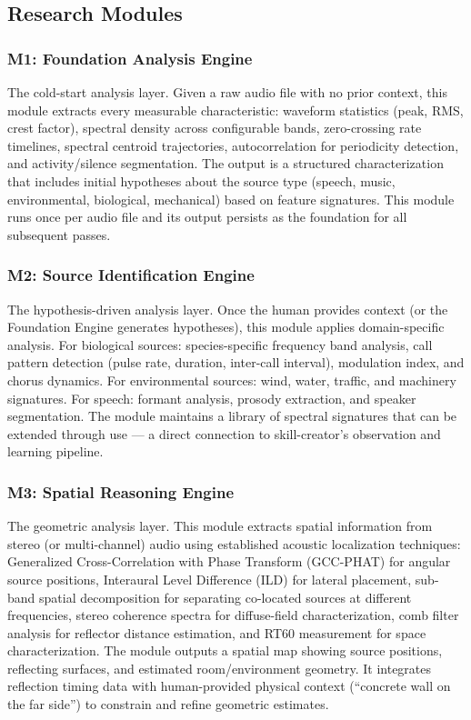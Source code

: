 \documentclass[11pt,letterpaper]{article}
\begin{document}
\subsection{Research Modules}

\subsubsection{M1: Foundation Analysis Engine}

The cold-start analysis layer. Given a raw audio file with no prior context, this module extracts every measurable characteristic: waveform statistics (peak, RMS, crest factor), spectral density across configurable bands, zero-crossing rate timelines, spectral centroid trajectories, autocorrelation for periodicity detection, and activity/silence segmentation. The output is a structured characterization that includes initial hypotheses about the source type (speech, music, environmental, biological, mechanical) based on feature signatures. This module runs once per audio file and its output persists as the foundation for all subsequent passes.

\subsubsection{M2: Source Identification Engine}

The hypothesis-driven analysis layer. Once the human provides context (or the Foundation Engine generates hypotheses), this module applies domain-specific analysis. For biological sources: species-specific frequency band analysis, call pattern detection (pulse rate, duration, inter-call interval), modulation index, and chorus dynamics. For environmental sources: wind, water, traffic, and machinery signatures. For speech: formant analysis, prosody extraction, and speaker segmentation. The module maintains a library of spectral signatures that can be extended through use --- a direct connection to skill-creator's observation and learning pipeline.

\subsubsection{M3: Spatial Reasoning Engine}

The geometric analysis layer. This module extracts spatial information from stereo (or multi-channel) audio using established acoustic localization techniques: Generalized Cross-Correlation with Phase Transform (GCC-PHAT) for angular source positions, Interaural Level Difference (ILD) for lateral placement, sub-band spatial decomposition for separating co-located sources at different frequencies, stereo coherence spectra for diffuse-field characterization, comb filter analysis for reflector distance estimation, and RT60 measurement for space characterization. The module outputs a spatial map showing source positions, reflecting surfaces, and estimated room/environment geometry. It integrates reflection timing data with human-provided physical context (``concrete wall on the far side'') to constrain and refine geometric estimates.
\end{document}
